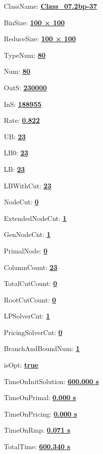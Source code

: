 \documentclass[11pt]{article}
\begin{document}
\pagestyle{empty}


ClassName: \underline{\textbf{Class_07.2bp-37}}
\par
BinSize: \underline{\textbf{100 × 100}}
\par
ReduceSize: \underline{\textbf{100 × 100}}
\par
TypeNum: \underline{\textbf{80}}
\par
Num: \underline{\textbf{80}}
\par
OutS: \underline{\textbf{230000}}
\par
InS: \underline{\textbf{188955}}
\par
Rate: \underline{\textbf{0.822}}
\par
UB: \underline{\textbf{23}}
\par
LB0: \underline{\textbf{23}}
\par
LB: \underline{\textbf{23}}
\par
LBWithCut: \underline{\textbf{23}}
\par
NodeCut: \underline{\textbf{0}}
\par
ExtendedNodeCnt: \underline{\textbf{1}}
\par
GenNodeCnt: \underline{\textbf{1}}
\par
PrimalNode: \underline{\textbf{0}}
\par
ColumnCount: \underline{\textbf{23}}
\par
TotalCutCount: \underline{\textbf{0}}
\par
RootCutCount: \underline{\textbf{0}}
\par
LPSolverCnt: \underline{\textbf{1}}
\par
PricingSolverCnt: \underline{\textbf{0}}
\par
BranchAndBoundNum: \underline{\textbf{1}}
\par
isOpt: \underline{\textbf{true}}
\par
TimeOnInitSolution: \underline{\textbf{600.000 s}}
\par
TimeOnPrimal: \underline{\textbf{0.000 s}}
\par
TimeOnPricing: \underline{\textbf{0.000 s}}
\par
TimeOnRmp: \underline{\textbf{0.071 s}}
\par
TotalTime: \underline{\textbf{600.340 s}}
\par
\newpage


\end{document}
